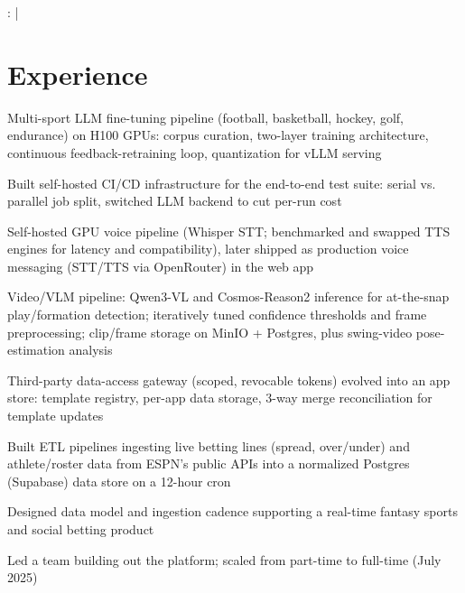 \documentclass[]{jack-resume}
\begin{document}
\raggedright{
    :
      \href{https://www.linkedin.com/in/jack-sturtevant/}{ \ExternalLink} |
     \href{https://github.com/jacksturt}{ \ExternalLink}}


\section{Experience}

\begin{tightemize}
    \item Multi-sport LLM fine-tuning pipeline (football, basketball, hockey, golf, endurance) on H100 GPUs: corpus curation, two-layer training architecture, continuous feedback-retraining loop, quantization for vLLM serving
    \item Built self-hosted CI/CD infrastructure for the end-to-end test suite: serial vs. parallel job split, switched LLM backend to cut per-run cost
    \item Self-hosted GPU voice pipeline (Whisper STT; benchmarked and swapped TTS engines for latency and compatibility), later shipped as production voice messaging (STT/TTS via OpenRouter) in the web app
    \item Video/VLM pipeline: Qwen3-VL and Cosmos-Reason2 inference for at-the-snap play/formation detection; iteratively tuned confidence thresholds and frame preprocessing; clip/frame storage on MinIO + Postgres, plus swing-video pose-estimation analysis
    \item Third-party data-access gateway (scoped, revocable tokens) evolved into an app store: template registry, per-app data storage, 3-way merge reconciliation for template updates
\end{tightemize}
\sectionsep

\begin{tightemize}
    \item Built ETL pipelines ingesting live betting lines (spread, over/under) and athlete/roster data from ESPN's public APIs into a normalized Postgres (Supabase) data store on a 12-hour cron
    \item Designed data model and ingestion cadence supporting a real-time fantasy sports and social betting product
    \item Led a team building out the platform; scaled from part-time to full-time (July 2025)
\end{tightemize}
\sectionsep
\end{document}
